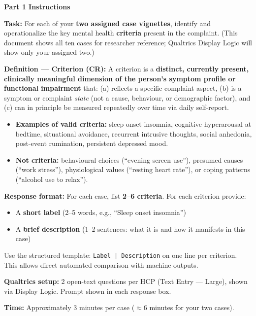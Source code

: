 \documentclass[11pt,a4paper]{article}
\begin{document}
\begin{tcolorbox}[colback=PartOneBG,colframe=PrimaryBlue,arc=2.5mm,boxrule=0.9pt,left=10pt,right=10pt,top=9pt,bottom=9pt]
\textbf{\color{PrimaryBlue}Part 1 Instructions}

\smallskip
\textbf{Task:} For each of your \textbf{two assigned case vignettes}, identify and operationalize the key mental health \textbf{criteria} present in the complaint. (This document shows all ten cases for researcher reference; Qualtrics Display Logic will show only your assigned two.)

\textbf{Definition --- Criterion (CR):} A criterion is a \textbf{distinct, currently present, clinically meaningful dimension of the person's symptom profile or functional impairment} that: (a) reflects a specific complaint aspect, (b) is a symptom or complaint \emph{state} (not a cause, behaviour, or demographic factor), and (c) can in principle be measured repeatedly over time via daily self-report.

\begin{itemize}[topsep=3pt,itemsep=2pt]
\item \textbf{Examples of valid criteria:} sleep onset insomnia, cognitive hyperarousal at bedtime, situational avoidance, recurrent intrusive thoughts, social anhedonia, post-event rumination, persistent depressed mood.
\item \textbf{Not criteria:} behavioural choices (``evening screen use''), presumed causes (``work stress''), physiological values (``resting heart rate''), or coping patterns (``alcohol use to relax'').
\end{itemize}

\textbf{Response format:} For each case, list \textbf{2--6 criteria}. For each criterion provide:
\begin{itemize}
\item A \textbf{short label} (2--5 words, e.g., ``Sleep onset insomnia'')
\item A \textbf{brief description} (1--2 sentences: what it is and how it manifests in this case)
\end{itemize}
Use the structured template: \texttt{Label | Description} on one line per criterion. This allows direct automated comparison with machine outputs.

\textbf{Qualtrics setup:} 2 open-text questions per HCP (Text Entry --- Large), shown via Display Logic. Prompt shown in each response box.

\textbf{Time:} Approximately 3 minutes per case ($\approx$6 minutes for your two cases).
\end{tcolorbox}
\end{document}
